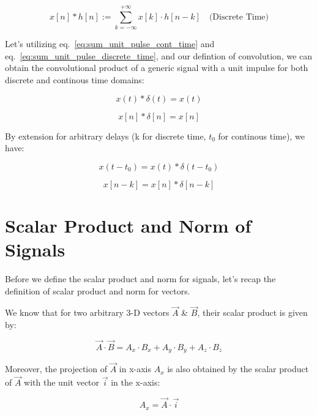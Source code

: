 \documentclass[letterpaper,12pt]{article}
\begin{document}
\begin{equation}
    x[n] * h[n] := \sum_{k=-\infty}^{+\infty} x[k] \cdot h[n-k] \quad \text{(Discrete Time)}
    \label{eq:convolution_discrete_time}
\end{equation}

Let's utilizing eq.~\ref{eq:sum_unit_pulse_cont_time} and
eq.~\ref{eq:sum_unit_pulse_discrete_time}, and our defintion of convolution, we
can obtain the convolutional product of a generic signal with a unit impulse
for both discrete and continous time domains:

\begin{equation}
    x(t) * \delta(t) = x(t)
    \label{eq:convolution_unit_impulse_cont_time}
\end{equation}

\begin{equation}
    x[n] * \delta[n] = x[n]
    \label{eq:convolution_unit_impulse_discrete_time}
\end{equation}

By extension for arbitrary delays (k for discrete time, $t_{0}$ for continous
time), we have:

\begin{equation}
    x(t - t_{0}) = x(t) * \delta(t - t_{0})
    \label{eq:convolution_unit_impulse_cont_time_delayed}
\end{equation}

\begin{equation}
    x[n - k] = x[n] * \delta[n - k]
    \label{eq:convolution_unit_impulse_discrete_time_delayed}
\end{equation}

\section{Scalar Product and Norm of Signals}

Before we define the scalar product and norm for signals, let's recap the
definition of scalar product and norm for vectors.

We know that for two arbitrary 3-D vectors $\Vec{A}$ \& $\Vec{B}$, their scalar
product is given by:

\[\Vec{A} \cdot \Vec{B} = A_{x}\cdot B_{x} + A_{y}\cdot B_{y} + A_{z}\cdot B_{z}\]

Moreover, the projection of $\Vec{A}$ in x-axis $A_{x}$ is also obtained by the
scalar product of $\Vec{A}$ with the unit vector $\Vec{i}$ in the x-axis:

\[A_{x} = \Vec{A}\cdot \Vec{i}\]
\end{document}
